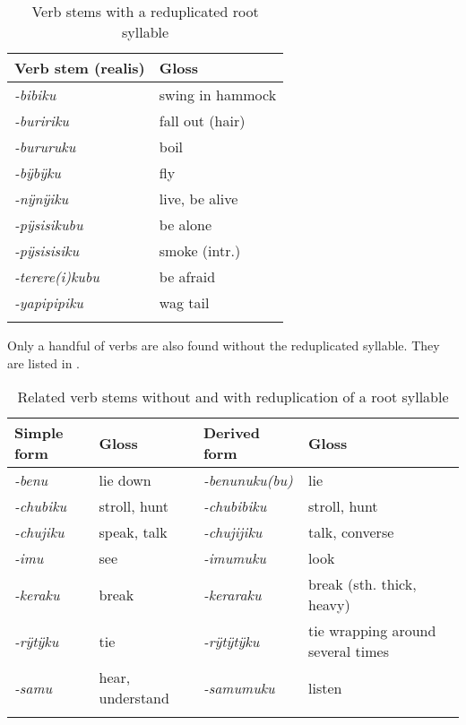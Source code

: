 \begin{table}
\caption{Verb stems with a reduplicated root syllable}

\begin{tabular}{ll}
\lsptoprule
Verb stem (realis) &  Gloss \\
\midrule
\textit{-bibiku} &  swing in hammock\\
\textit{-buririku} & fall out (hair)\\
\textit{-bururuku} &  boil\\
\textit{-bÿbÿku} &  fly\\
\textit{-nÿnÿiku} &  live, be alive\\
\textit{-pÿsisikubu} &  be alone\\
\textit{-pÿsisisiku} &  smoke (intr.)\\
\textit{-terere(i)kubu} & be afraid\\
\textit{-yapipipiku} &  wag tail\\
\lspbottomrule
\end{tabular}

\label{table:RDPL}
\end{table}


Only a handful of verbs are also found without the reduplicated syllable. They are listed in .

\begin{table}
\caption{Related verb stems without and with reduplication of a root syllable}

\begin{tabularx}{\textwidth}{lllQ}
\lsptoprule
Simple form & Gloss & Derived form & Gloss \\
\midrule
\textit{-benu} & lie down & \textit{-benunuku(bu)} & lie\\
\textit{-chubiku} & stroll, hunt & \textit{-chubibiku} & stroll, hunt\\
\textit{-chujiku} & speak, talk & \textit{-chujijiku} & talk, converse\\
\textit{-imu} & see & \textit{-imumuku} & look\\
\textit{-keraku} & break  & \textit{-keraraku} & break (sth. thick, heavy)\\
\textit{-rÿtÿku} & tie & \textit{-rÿtÿtÿku} & tie wrapping around several times \\
\textit{-samu} & hear, understand & \textit{-samumuku} & listen\\
\lspbottomrule
\end{tabularx}

\label{table:RDPL-deriv}
\end{table}

